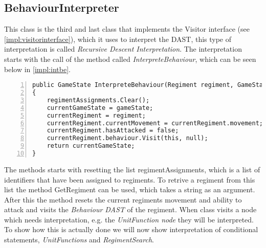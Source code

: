 \subsection{BehaviourInterpreter}
	This class is the third and last class that implements the Visitor interface (see \ref{impl:visitorinterface}), which it uses to interpret the 
	DAST, this type of interpretation is called {\it Recursive Descent Interpretation}. The interpretation starts with the call of the
	method called {\it InterpreteBehaviour}, which can be seen below in \ref{impl:intbe}.
	\begin{lstlisting}[basicstyle=\small\sffamily,
		keywords={break,case,const,continue,default,else,enum,
		for,if,return,switch,while,do,long,void,int,float,double,
		char,struct,typedef,include,size\_t},
		keywordstyle={\color{blue}},
		comment={[l]{//}}, morecomment={[s]{/*}{*/}}, commentstyle=\itshape,
		columns={[l]flexible}, numbers=left, numberstyle=\tiny,
		frameround=fftt, frame=shadowbox, captionpos=b,
		caption={The method InterpreteBehaviour},
		label=impl:intbe]
public GameState InterpreteBehaviour(Regiment regiment, GameState gameState)
{
	regimentAssignments.Clear();
	currentGameState = gameState;
	currentRegiment = regiment;
	currentRegiment.currentMovement = currentRegiment.movement;
	currentRegiment.hasAttacked = false;
	currentRegiment.behaviour.Visit(this, null);
	return currentGameState;
}		
	\end{lstlisting}
	The methods starts with resetting the list regimentAssignments, which is a list of identifiers that have been assigned to regiments. To retrive 
	a regiment from this list the method GetRegiment can be used, which takes a string as an argument.
	After this the method resets the current regiments movement and ability to attack and visits the {\it Behaviour DAST} of the regiment. 
	When class visits a node which needs interpretation, e.g. the {\it UnitFunction node} they will be interpreted. To show 
	how this is actually done we will now show interpretation of conditional statements, {\it UnitFunctions} and {\it RegimentSearch}.
	
